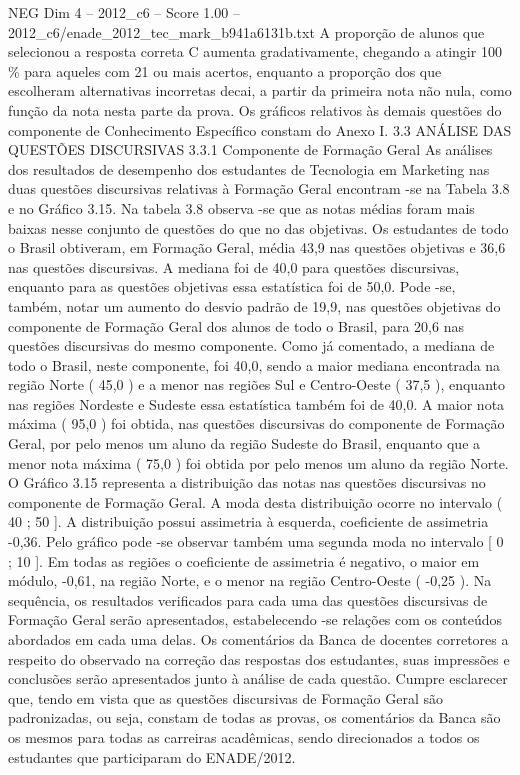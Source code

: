 \begin{textsample}{NEG Dim 4 – 2012\_c6 – Score 1.00 – 2012\_c6/enade\_2012\_tec\_mark\_b941a6131b.txt}
A proporção de alunos que selecionou a resposta correta C aumenta gradativamente, chegando a atingir 100 \% para aqueles com 21 ou mais acertos, enquanto a proporção dos que escolheram alternativas incorretas decai, a partir da primeira nota não nula, como função da nota nesta parte da prova.
Os gráficos relativos às demais questões do componente de Conhecimento Específico constam do Anexo I. 3.3 ANÁLISE DAS QUESTÕES DISCURSIVAS 3.3.1 Componente de Formação Geral As análises dos resultados de desempenho dos estudantes de Tecnologia em Marketing nas duas questões discursivas relativas à Formação Geral encontram -se na Tabela 3.8 e no Gráfico 3.15.
Na tabela 3.8 observa -se que as notas médias foram mais baixas nesse conjunto de questões do que no das objetivas.
Os estudantes de todo o Brasil obtiveram, em Formação Geral, média 43,9 nas questões objetivas e 36,6 nas questões discursivas.
A mediana foi de 40,0 para questões discursivas, enquanto para as questões objetivas essa estatística foi de 50,0.
Pode -se, também, notar um aumento do desvio padrão de 19,9, nas questões objetivas do componente de Formação Geral dos alunos de todo o Brasil, para 20,6 nas questões discursivas do mesmo componente.
Como já comentado, a mediana de todo o Brasil, neste componente, foi 40,0, sendo a maior mediana encontrada na região Norte ( 45,0 ) e a menor nas regiões Sul e Centro-Oeste ( 37,5 ), enquanto nas regiões Nordeste e Sudeste essa estatística também foi de 40,0.
A maior nota máxima ( 95,0 ) foi obtida, nas questões discursivas do componente de Formação Geral, por pelo menos um aluno da região Sudeste do Brasil, enquanto que a menor nota máxima ( 75,0 ) foi obtida por pelo menos um aluno da região Norte.
O Gráfico 3.15 representa a distribuição das notas nas questões discursivas no componente de Formação Geral.
A moda desta distribuição ocorre no intervalo ( 40 ; 50 ].
A distribuição possui assimetria à esquerda, coeficiente de assimetria -0,36.
Pelo gráfico pode -se observar também uma segunda moda no intervalo [ 0 ; 10 ].
Em todas as regiões o coeficiente de assimetria é negativo, o maior em módulo, -0,61, na região Norte, e o menor na região Centro-Oeste ( -0,25 ).
Na sequência, os resultados verificados para cada uma das questões discursivas de Formação Geral serão apresentados, estabelecendo -se relações com os conteúdos abordados em cada uma delas.
Os comentários da Banca de docentes corretores a respeito do observado na correção das respostas dos estudantes, suas impressões e conclusões serão apresentados junto à análise de cada questão.
Cumpre esclarecer que, tendo em vista que as questões discursivas de Formação Geral são padronizadas, ou seja, constam de todas as provas, os comentários da Banca são os mesmos para todas as carreiras acadêmicas, sendo direcionados a todos os estudantes que participaram do ENADE/2012.

\end{textsample}
